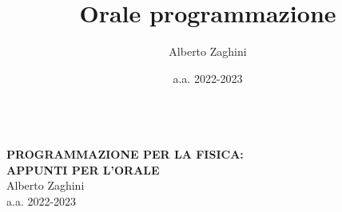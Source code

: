 \documentclass[10pt, oneside]{book}
\title{Orale programmazione}
\author{Alberto Zaghini}
\date{a.a. 2022-2023}
\begin{document}
\makeatletter
\begin{titlepage}
\vspace{-2.1cm}
\hspace{0cm}
\vfill
\, \\\larger[20]\textsf{\textbf{PROGRAMMAZIONE PER LA FISICA:\\APPUNTI PER L'ORALE}}
\\\smaller[2]Alberto Zaghini
\\a.a. 2022-2023
\\~\\ \larger[20]\,\,
\\~\\ \,\,

\vfill
\hspace{0cm}
\end{titlepage}
\makeatother
\end{document}
